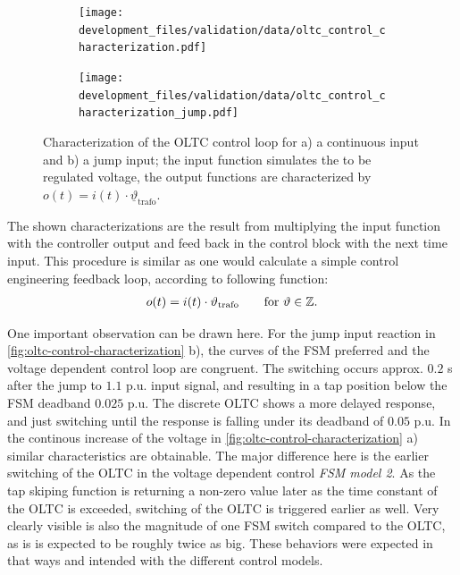 \begin{figure}[htbp!]
        \centering
        \begin{subfigure}[b]{.49\linewidth}
                \centering
                \texttt{[image: development\_files/validation/data/oltc\_control\_characterization.pdf]}
        \end{subfigure}
        \begin{subfigure}[b]{.49\linewidth}
                \centering
                \texttt{[image: development\_files/validation/data/oltc\_control\_characterization\_jump.pdf]}
        \end{subfigure}
        \caption[Characterization of the OLTC control loops for a continous input]{Characterization of the OLTC control loop for a) a continuous input and b) a jump input; the input function simulates the to be regulated voltage, the output functions are characterized by $o(t)=i(t) \cdot \underline{\vartheta}_\mathrm{trafo}$.}
        \label{fig:oltc-control-characterization}
\end{figure}

The shown characterizations are the result from multiplying the input function with the controller output and feed back in the control block with the next time input.
This procedure is similar as one would calculate a simple control engineering feedback loop, according to following function:
\begin{align}
        o(t)=i(t) \cdot \vartheta_\mathrm{trafo} \quad\quad \text{for }\vartheta \in \mathbb{Z}. \notag
\end{align}

One important observation can be drawn here.
For the jump input reaction in \autoref{fig:oltc-control-characterization} b), the curves of the \acs{FSM} preferred and the voltage dependent control loop are congruent.
The switching occurs approx. $0.2$ s after the jump to $1.1$ p.u. input signal, and resulting in a tap position below the \acs{FSM} deadband $0.025$ p.u.
The discrete \acs{OLTC} shows a more delayed response, and just switching until the response is falling under its deadband of $0.05$ p.u.
In the continous increase of the voltage in \autoref{fig:oltc-control-characterization} a) similar characteristics are obtainable.
The major difference here is the earlier switching of the \acs{OLTC} in the voltage dependent control \textit{FSM model 2}.
As the tap skiping function is returning a non-zero value later as the time constant of the \acs{OLTC} is exceeded, switching of the \acs{OLTC} is triggered earlier as well.
Very clearly visible is also the magnitude of one \acs{FSM} switch compared to the \acs{OLTC}, as is is expected to be roughly twice as big.
These behaviors were expected in that ways and intended with the different control models.

